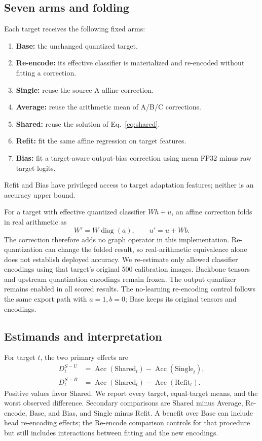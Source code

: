 \documentclass[10pt,twocolumn]{article}
\newcommand{\Acc}{\operatorname{Acc}}
\newcommand{\diag}{\operatorname{diag}}
\begin{document}
\subsection{Seven arms and folding}
Each target receives the following fixed arms:
\begin{enumerate}
\item \textbf{Base:} the unchanged quantized target.
\item \textbf{Re-encode:} its effective classifier is materialized and re-encoded without fitting a correction.
\item \textbf{Single:} reuse the source-A affine correction.
\item \textbf{Average:} reuse the arithmetic mean of A/B/C corrections.
\item \textbf{Shared:} reuse the solution of Eq.~\eqref{eq:shared}.
\item \textbf{Refit:} fit the same affine regression on target features.
\item \textbf{Bias:} fit a target-aware output-bias correction using mean FP32 minus raw target logits.
\end{enumerate}
Refit and Bias have privileged access to target adaptation features; neither is an accuracy upper bound.

For a target with effective quantized classifier $Wh+u$, an affine correction folds in real arithmetic as
\begin{equation}
 W'=W\diag(a),\qquad u'=u+Wb.
 \label{eq:fold}
\end{equation}
The correction therefore adds no graph operator in this implementation. Re-quantization can change the folded result, so real-arithmetic equivalence alone does not establish deployed accuracy. We re-estimate only allowed classifier encodings using that target's original 500 calibration images. Backbone tensors and upstream quantization encodings remain frozen. The output quantizer remains enabled in all scored results. The no-learning re-encoding control follows the same export path with $a=1,b=0$; Base keeps its original tensors and encodings.

\subsection{Estimands and interpretation}
For target $t$, the two primary effects are
\begin{align}
 D^{S-U}_t&=\Acc(\mathrm{Shared}_t)-\Acc(\mathrm{Single}_t),\\
 D^{S-R}_t&=\Acc(\mathrm{Shared}_t)-\Acc(\mathrm{Refit}_t).
\end{align}
Positive values favor Shared. We report every target, equal-target means, and the worst observed difference. Secondary comparisons are Shared minus Average, Re-encode, Base, and Bias, and Single minus Refit. A benefit over Base can include head re-encoding effects; the Re-encode comparison controls for that procedure but still includes interactions between fitting and the new encodings.
\end{document}
